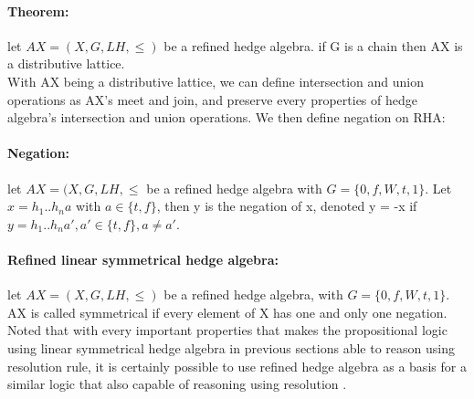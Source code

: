 \documentclass[26pt,fleqn,]{article}
\begin{document}
\paragraph{Theorem: } let \(AX = (X,G,LH,\le)\) be a refined hedge algebra. if G is a chain then AX is
a distributive lattice.\\
With AX being a distributive lattice, we can define intersection and union operations as AX's meet and 
join, and preserve every properties of hedge algebra's intersection and union operations. We then define
negation on RHA:\\
\paragraph{Negation: } let \(AX = (X,G,LH,\le\) be a refined hedge algebra with \(G = \{
0,f,W,t,1\}\). Let \(x = h_1..h_n a\) with \(a \in \{t,f\}\), then y is the negation of x, denoted 
y = -x if \(y = h_1..h_n a', a' \in \{t,f\}, a \neq a'\).\\
\paragraph{Refined linear symmetrical hedge algebra: } let \(AX = (X,G,LH,\le)\) be a refined hedge
algebra, with \(G = \{0,f,W,t,1\}\). AX is called symmetrical if every element of X has one and only one
 negation.\\
Noted that with every important properties that makes the propositional logic using linear symmetrical
hedge algebra in previous sections able to reason using resolution rule, it is certainly possible to 
use refined hedge algebra as a basis for a similar logic that also capable of reasoning using resolution
.\\\\
\end{document}
